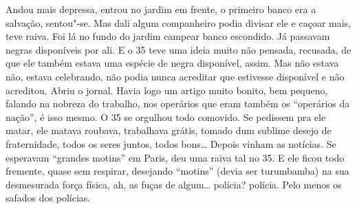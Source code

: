 Andou mais depressa, entrou no jardim em frente, o primeiro banco era a
salvação, sentou"-se. Mas dali algum companheiro podia divisar ele e
caçoar mais, teve raiva. Foi lá no fundo do jardim campear banco
escondido. Já passavam negras disponíveis por ali. E o 35 teve uma ideia
muito não pensada, recusada, de que ele também estava uma espécie de
negra disponível, assim. Mas não estava não, estava celebrando, não
podia nunca acreditar que estivesse disponível e não acreditou. Abriu o
jornal. Havia logo um artigo muito bonito, bem pequeno, falando na
nobreza do trabalho, nos operários que eram também os ``operários da
nação'', é isso mesmo. O 35 se orgulhou todo comovido. Se pedissem pra
ele matar, ele matava roubava, trabalhava grátis, tomado dum sublime
desejo de fraternidade, todos os seres juntos, todos bons\ldots{} Depois
vinham as notícias. Se esperavam ``grandes motins'' em Paris, deu uma
raiva tal no 35. E ele ficou todo fremente, quase sem respirar,
desejando ``motins'' (devia ser turumbamba) na sua desmesurada força
física, ah, as fuças de algum\ldots{} polícia? polícia. Pelo menos os safados
dos polícias.

